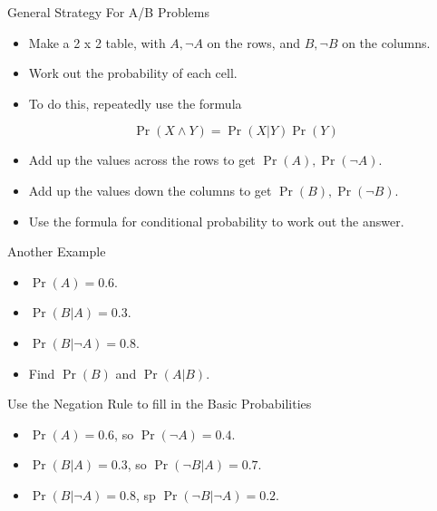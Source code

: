 \documentclass[
  ignorenonframetext,
]{beamer}
\providecommand{\tightlist}{%
  \setlength{\itemsep}{0pt}\setlength{\parskip}{0pt}}
\renewcommand{\,}{\text{, }}
\begin{document}
\begin{frame}{General Strategy For A/B Problems}
\protect\hypertarget{general-strategy-for-ab-problems}{}

\begin{itemize}
\tightlist
\item
  Make a 2 x 2 table, with \(A, \neg A\) on the rows, and \(B, \neg B\)
  on the columns.
\item
  Work out the probability of each cell.
\item
  To do this, repeatedly use the formula
\end{itemize}

\[
\Pr(X \wedge Y) = \Pr(X | Y)\Pr(Y)
\]

\begin{itemize}
\tightlist
\item
  Add up the values across the rows to get \(\Pr(A), \Pr(\neg A)\).
\item
  Add up the values down the columns to get \(\Pr(B), \Pr(\neg B)\).
\item
  Use the formula for conditional probability to work out the answer.
\end{itemize}

\end{frame}

\begin{frame}{Another Example}
\protect\hypertarget{another-example}{}

\begin{itemize}
\tightlist
\item
  \(\Pr(A) = 0.6\).
\item
  \(\Pr(B | A) = 0.3\).
\item
  \(\Pr(B | \neg A) = 0.8\).
\item
  Find \(\Pr(B)\) and \(\Pr(A | B)\).
\end{itemize}

\end{frame}

\begin{frame}{Use the Negation Rule to fill in the Basic Probabilities}
\protect\hypertarget{use-the-negation-rule-to-fill-in-the-basic-probabilities}{}

\begin{itemize}
\tightlist
\item
  \(\Pr(A) = 0.6\), so \(\Pr(\neg A) = 0.4\). \pause
\item
  \(\Pr(B | A) = 0.3\), so \(\Pr(\neg B | A) = 0.7\). \pause
\item
  \(\Pr(B | \neg A) = 0.8\), sp \(\Pr(\neg B | \neg A) = 0.2\).
\end{itemize}

\end{frame}
\end{document}

